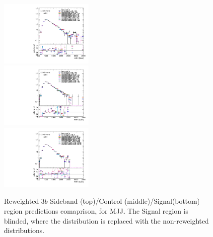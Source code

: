 \begin{figure}[htbp!]
\begin{center}
\includegraphics[width=0.4\textwidth,angle=-90]{figures/boosted/AppendixReweight/Compare/Data_ThreeTag_Sideband_directcompare_mHH_l_1.pdf}\\
\includegraphics[width=0.4\textwidth,angle=-90]{figures/boosted/AppendixReweight/Compare/Data_ThreeTag_Control_directcompare_mHH_l_1.pdf}\\
\includegraphics[width=0.4\textwidth,angle=-90]{figures/boosted/AppendixReweight/Compare/Data_ThreeTag_Signal_directcompare_mHH_l_1.pdf}
\caption{Reweighted $3b$ Sideband (top)/Control (middle)/Signal(bottom) region predictions comaprison, for MJJ. The Signal region is blinded, where the distribution is replaced with the non-reweighted distributions.}
\label{fig:app-rw-comp-3b}
\end{center}
\end{figure}

